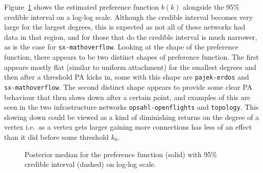 \documentclass[
  sn-basic,
  10pt,
]{sn-jnl}
\theoremstyle{thmstyleone}
\theoremstyle{thmstyleone}
\theoremstyle{remark}
\theoremstyle{plain}
\theoremstyle{plain}
\theoremstyle{remark}
\begin{document}
Figure~\ref{fig-pa} shows the estimated preference function \(b(k)\)
alongside the 95\% credible interval on a log-log scale. Although the
credible interval becomes very large for the largest degrees, this is
expected as not all of these networks had data in that region, and for
those that do the credible interval is much narrower, as is the case for
\texttt{sx-mathoverflow}. Looking at the shape of the preference
function, there appears to be two distinct shapes of preference
function. The first appears mostly flat (similar to uniform attachment)
for the smallest degrees and then after a threshold PA kicks in, some
with this shape are \texttt{pajek-erdos} and \texttt{sx-mathoverflow}.
The second distinct shape appears to provide some clear PA behaviour
that then slows down after a certain point, and examples of this are
seen in the two infrastructure networks \texttt{opsahl-openflights} and
\texttt{topology}. This slowing down could be viewed as a kind of
diminishing returns on the degree of a vertex i.e.~as a vertex gets
larger gaining more connections has less of an effect than it did before
some threshold \(k_0\).

\begin{figure}[H]


\caption{\label{fig-pa}Posterior median for the preference function
(solid) with 95\% credible interval (dashed) on log-log scale.}

\end{figure}%

\newpage
\end{document}
